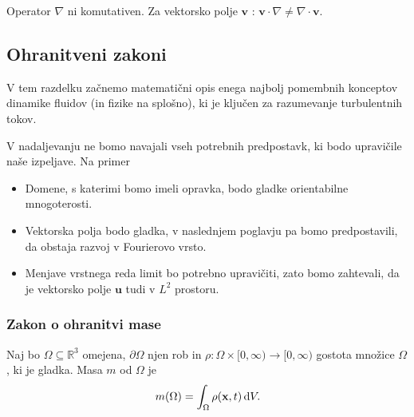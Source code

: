 \documentclass[mat2, tisk]{fmfdelo}
\newcommand{\R}{\mathbb R}
\newcommand{\bd}{\textbf}
\begin{document}
\begin{opomba}
Operator $\nabla$ ni komutativen. Za vektorsko polje $\bd{v}$ : $\bd{v} \cdot \nabla \neq \nabla \cdot \bd{v}$.
\end{opomba}


\subsection{Ohranitveni zakoni}

V tem razdelku začnemo matematični opis enega najbolj pomembnih konceptov dinamike fluidov (in fizike na splošno), 
ki je ključen za razumevanje turbulentnih tokov. 

\begin{opomba}
V nadaljevanju ne bomo navajali vseh potrebnih predpostavk, ki bodo upravičile naše izpeljave. Na primer 
\begin{itemize}
  \item Domene, s katerimi bomo imeli opravka, bodo gladke orientabilne mnogoterosti.
  \item Vektorska polja bodo gladka, v naslednjem poglavju pa bomo predpostavili, da 
  obstaja razvoj v Fourierovo vrsto.
  \item Menjave vrstnega reda limit bo potrebno upravičiti, zato bomo zahtevali, da je 
  vektorsko polje $\bd{u}$ tudi v $L^2$ prostoru.
\end{itemize}
\end{opomba}

\subsubsection{Zakon o ohranitvi mase}
Naj bo $\Omega \subseteq \R^3$ omejena, $\partial \Omega$ njen rob in $\rho: \Omega \times [0, \infty) \rightarrow [0, \infty)$ 
gostota množice $\Omega$, ki je gladka. Masa $m$ od $\Omega$ je 
\begin{equation}
  m(\Omega) = \int_\Omega \rho(\bd{x}, t) \dif V.
\end{equation}
\begin{center}
\end{center}
~\\[1mm]
\end{document}
